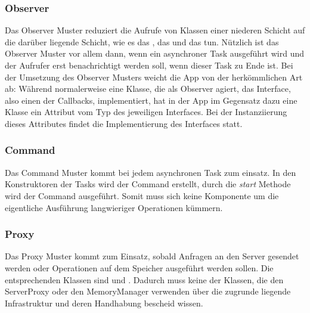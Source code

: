 \subsubsection{Observer}
Das Observer Muster reduziert die Aufrufe von Klassen einer niederen Schicht auf die darüber liegende Schicht, wie es das , das  und das  tun. Nützlich ist das Observer Muster vor allem dann, wenn ein asynchroner Task ausgeführt wird und der Aufrufer erst benachrichtigt werden soll, wenn dieser Task zu Ende ist.\newline
Bei der Umsetzung des Observer Musters weicht die App von der herkömmlichen Art ab: Während normalerweise eine Klasse, die als Observer agiert, das Interface, also einen der Callbacks, implementiert, hat in der App im Gegensatz dazu eine Klasse ein Attribut vom Typ des jeweiligen Interfaces. Bei der Instanziierung dieses Attributes findet die Implementierung des Interfaces statt.

\subsubsection{Command}
Das Command Muster kommt bei jedem asynchronen Task zum einsatz. In den Konstruktoren der Tasks wird der Command erstellt, durch die \textit{start} Methode wird der Command ausgeführt. Somit muss sich keine Komponente um die eigentliche Ausführung langwieriger Operationen kümmern.

\subsubsection{Proxy}
Das Proxy Muster kommt zum Einsatz, sobald Anfragen an den Server gesendet werden oder Operationen auf dem Speicher ausgeführt werden sollen. Die entsprechenden Klassen sind  und . Dadurch muss keine der Klassen, die den ServerProxy oder den MemoryManager verwenden über die zugrunde liegende Infrastruktur und deren Handhabung bescheid wissen.


